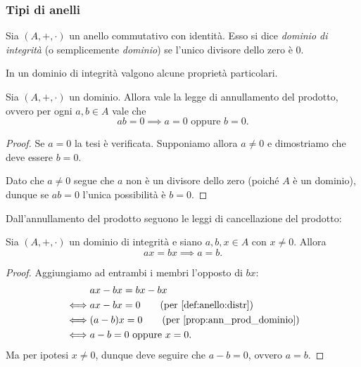 \subsubsection{Tipi di anelli}

\begin{definition}
    \label{def:dominio}
    Sia $(A, +, \cdot)$ un anello commutativo con identità. Esso si dice \emph{dominio di integrità} (o semplicemente \emph{dominio}) se l'unico divisore dello zero è $0$.
\end{definition}

In un dominio di integrità valgono alcune proprietà particolari.

\begin{proposition}
    \label{prop:ann_prod_dominio}
    Sia $(A, +, \cdot)$ un dominio. Allora vale la legge di annullamento del prodotto, ovvero per ogni $a, b \in A$ vale che \[
        ab = 0 \implies a = 0 \text{ oppure } b = 0.    
    \]
\end{proposition}
\begin{proof}
    Se $a = 0$ la tesi è verificata. Supponiamo allora $a \neq 0$ e dimostriamo che deve essere $b = 0$.

    Dato che $a \neq 0$ segue che $a$ non è un divisore dello zero (poiché $A$ è un dominio), dunque se $ab = 0$ l'unica possibilità è $b = 0$.
\end{proof}

Dall'annullamento del prodotto seguono le leggi di cancellazione del prodotto:
\begin{corollary}
    \label{cor:canc_prod_dominio}
    Sia $(A, +, \cdot)$ un dominio di integrità e siano $a, b, x \in A$ con $x \neq 0$. Allora \[
        ax = bx \implies a = b.    
    \]
\end{corollary}
\begin{proof}
    Aggiungiamo ad entrambi i membri l'opposto di $bx$: \begin{align*}
        &ax - bx = bx - bx\\
        \iff &ax - bx = 0 \tag{per \ref{def:anello:distr}}\\
        \iff &(a - b)x = 0 \tag{per \ref{prop:ann_prod_dominio}}\\
        \iff &a-b = 0 \text{ oppure } x = 0.
    \end{align*} Ma per ipotesi $x \neq 0$, dunque deve seguire che $a - b = 0$, ovvero $a = b$.
\end{proof}

